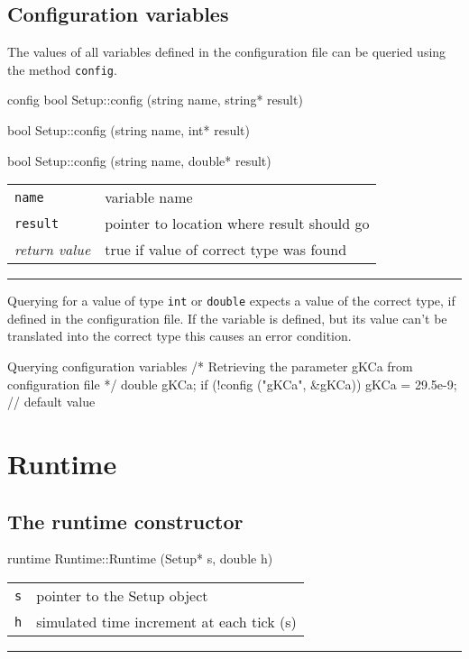 \documentclass[a4paper,twoside]{report}
\makeatletter
\newenvironment{parameters}%
{\begin{tabular}{@{\hspace{2em}}lp{0.6\textwidth}}}%
{\end{tabular}\par\vspace{1mm}\par\hrule\par\vspace{5mm}}
\makeatother
\begin{document}
\subsection{Configuration variables}

The values of all variables defined in the configuration file can be
queried using the method \lstinline|config|.

\begin{head}{config}
  bool Setup::config (string name, string* result)

  bool Setup::config (string name, int* result)

  bool Setup::config (string name, double* result)
\end{head}
\begin{parameters}
  \lstinline|name|     & variable name \\
  \lstinline|result|  & pointer to location where result should go \\
  \emph{return value} & true if value of correct type was found \\
\end{parameters}

Querying for a value of type \lstinline|int| or \lstinline|double|
expects a value of the correct type, if defined in the configuration
file.  If the variable is defined, but its value can't be translated
into the correct type this causes an error condition.

\begin{code}{Querying configuration variables}
/* Retrieving the parameter gKCa
   from configuration file */
double gKCa;
if (!config ("gKCa", &gKCa))
  gKCa = 29.5e-9; // default value
\end{code}

\section{Runtime}

\subsection{The runtime constructor}

\begin{head}{runtime}
  Runtime::Runtime (Setup* s, double h)
\end{head}
\begin{parameters}
  \lstinline|s| & pointer to the Setup object \\
  \lstinline|h| & simulated time increment at each tick (s) \\
\end{parameters}
\end{document}

